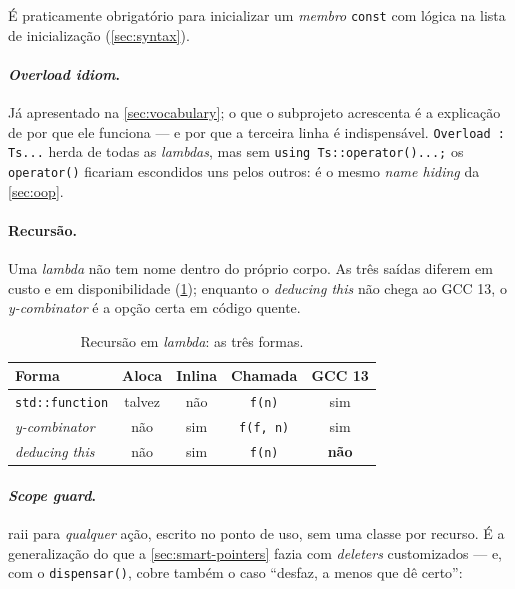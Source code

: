 É praticamente obrigatório para inicializar um \emph{membro} \texttt{const} com
lógica na lista de inicialização (\cref{sec:syntax}).

\paragraph{\emph{Overload idiom}.} Já apresentado na \cref{sec:vocabulary}; o
que o subprojeto acrescenta é a explicação de por que ele funciona --- e por que
a terceira linha é indispensável. \texttt{Overload : Ts...} herda de todas as
\emph{lambdas}, mas sem \texttt{using Ts::operator()...;} os
\texttt{operator()} ficariam escondidos uns pelos outros: é o mesmo \emph{name
hiding} da \cref{sec:oop}.

\paragraph{Recursão.} Uma \emph{lambda} não tem nome dentro do próprio corpo. As
três saídas diferem em custo e em disponibilidade
(\cref{tab:recursao-lambda}); enquanto o \emph{deducing this} não chega ao GCC
13, o \emph{y-combinator} é a opção certa em código quente.

\begin{table}[htbp]
\centering
\caption{Recursão em \emph{lambda}: as três formas.}
\label{tab:recursao-lambda}
\footnotesize
\begin{tabular}{@{}lcccc@{}}
\toprule
\textbf{Forma} & \textbf{Aloca} & \textbf{Inlina} & \textbf{Chamada} & \textbf{GCC 13} \\
\midrule
\texttt{std::function} & talvez & não & \texttt{f(n)}    & sim \\
\emph{y-combinator}    & não    & sim & \texttt{f(f, n)} & sim \\
\emph{deducing this}   & não    & sim & \texttt{f(n)}    & \textbf{não} \\
\bottomrule
\end{tabular}
\end{table}

\paragraph{\emph{Scope guard}.} \gls{raii} para \emph{qualquer} ação, escrito no
ponto de uso, sem uma classe por recurso. É a generalização do que a
\cref{sec:smart-pointers} fazia com \emph{deleters} customizados --- e, com o
\texttt{dispensar()}, cobre também o caso ``desfaz, a menos que dê certo'':


